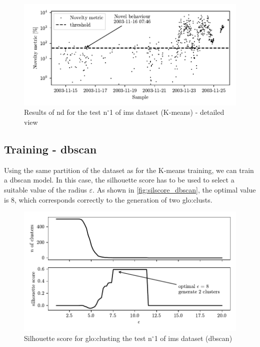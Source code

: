 \begin{figure}
    \centering
    \includegraphics{images/IMS/Novelty_01_500samples_bearing3x_detail.pdf}
    \caption{Results of \gls{nd} for the test $\text{n}^\circ$1 of \gls{ims} dataset (K-means) - detailed view}
    \label{fig:NoveltyScore_01_detail} 
\end{figure}

\subsection{Training - \gls{dbscan}}
Using the same partition of the dataset as for the K-means training, we can train a \gls{dbscan} model. In this case, the silhouette score has to be used to select a suitable value of the radius $\varepsilon$. As shown in \autoref{fig:silscore_dbscan}, the optimal value is 8, which corresponds correctly to the generation of two \gls{glo:clust}s.

\begin{figure}
    \centering
    \includegraphics{images/IMS/InertiaScore_01_dbscan.pdf}
    \caption{Silhouette score for \gls{glo:clust}ing the test $\text{n}^\circ$1 of \gls{ims} dataset (\gls{dbscan})}
    \label{fig:silscore_dbscan}
\end{figure}

